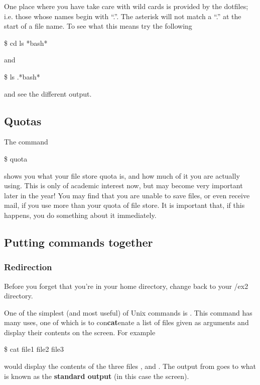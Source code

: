 One place where you have take care with wild cards is provided by the dotfiles; i.e. those
whose names begin with ``.''. The asterisk will not match a
``.'' at the start of a file name. To see what this means try the
following
\begin{ttoutenv}
\$  cd \return 
  ls *bash* \return
\end{ttoutenv}
%
and
%
\begin{ttoutenv}
\$  ls .*bash*\return
\end{ttoutenv}
and see the different output.

\subsection{Quotas}
The command

\begin{ttoutenv}
\$  quota\return
\end{ttoutenv}

shows you what your file store quota is, and how much of it you are
actually using. This is only of academic interest now, but may become
very important later in the year! You may find that you are unable to
save files, or even receive mail, if you use more than your quota of
file store. It is important that, if this happens, you do something
about it immediately.

 
\subsection{Putting commands together} 
\subsubsection{Redirection}  
Before you forget that you're in your home directory, change back to
your \crsname/ex2 directory.

One of the simplest (and most useful) of Unix commands is
. This command has many uses, one of which is to
con\textbf{cat}enate a list of files given as arguments and display
their contents on the screen. For example
\begin{ttoutenv}
\$  cat file1 file2 file3 \return
\end{ttoutenv}
would display the contents of the three files ,
 and .
The output from  goes to what is known as the
\textbf{standard output} (in this case the screen).

